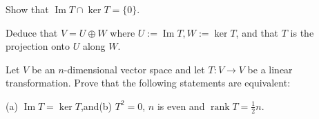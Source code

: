 \documentclass[answers]{exam}
\begin{document}
\begin{questions}
\begin{parts}
\begin{subparts}
\subpart%
Show that $\operatorname{Im} T \cap \ker T=\{0\}$.

\subpart%
Deduce that $V=U \oplus W$ where $U:=\operatorname{Im} T, W:=\ker T$, and that $T$ is the projection onto $U$ along $W$.
\end{subparts}
\end{parts}



\question%
Let $V$ be an $n$-dimensional vector space and let $T: V \to V$ be a linear transformation. Prove that the following statements are equivalent:\begin{center}(a) $\operatorname{Im} T=\ker T$,\qquad and\qquad (b) $T^{2}=0$, $n$ is even and $\operatorname{rank} T=\frac{1}{2} n$.\end{center}

\end{questions}
\end{document}
